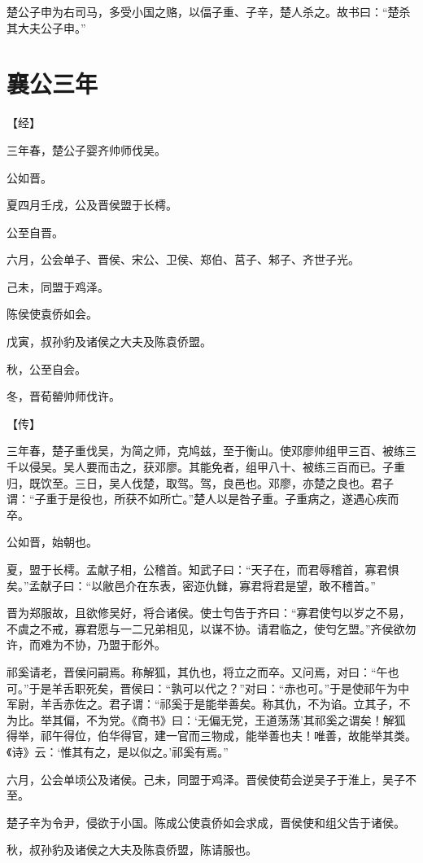 \documentclass[a4paper,12pt,UTF8,twoside]{ctexbook}
\begin{document}
楚公子申为右司马，多受小国之赂，以偪子重、子辛，楚人杀之。故书曰：“楚杀其大夫公子申。”

\section{襄公三年}



【经】

三年春，楚公子婴齐帅师伐吴。

公如晋。

夏四月壬戌，公及晋侯盟于长樗。

公至自晋。

六月，公会单子、晋侯、宋公、卫侯、郑伯、莒子、邾子、齐世子光。

己未，同盟于鸡泽。

陈侯使袁侨如会。

戊寅，叔孙豹及诸侯之大夫及陈袁侨盟。

秋，公至自会。

冬，晋荀罃帅师伐许。

【传】

三年春，楚子重伐吴，为简之师，克鸠兹，至于衡山。使邓廖帅组甲三百、被练三千以侵吴。吴人要而击之，获邓廖。其能免者，组甲八十、被练三百而已。子重归，既饮至。三日，吴人伐楚，取驾。驾，良邑也。邓廖，亦楚之良也。君子谓：“子重于是役也，所获不如所亡。”楚人以是咎子重。子重病之，遂遇心疾而卒。

公如晋，始朝也。

夏，盟于长樗。孟献子相，公稽首。知武子曰：“天子在，而君辱稽首，寡君惧矣。”孟献子曰：“以敝邑介在东表，密迩仇雠，寡君将君是望，敢不稽首。”

晋为郑服故，且欲修吴好，将合诸侯。使士匄告于齐曰：“寡君使匄以岁之不易，不虞之不戒，寡君愿与一二兄弟相见，以谋不协。请君临之，使匄乞盟。”齐侯欲勿许，而难为不协，乃盟于耏外。

祁奚请老，晋侯问嗣焉。称解狐，其仇也，将立之而卒。又问焉，对曰：“午也可。”于是羊舌职死矣，晋侯曰：“孰可以代之？”对曰：“赤也可。”于是使祁午为中军尉，羊舌赤佐之。君子谓：“祁奚于是能举善矣。称其仇，不为谄。立其子，不为比。举其偏，不为党。《商书》曰：‘无偏无党，王道荡荡’其祁奚之谓矣！解狐得举，祁午得位，伯华得官，建一官而三物成，能举善也夫！唯善，故能举其类。《诗》云：‘惟其有之，是以似之。’祁奚有焉。”

六月，公会单顷公及诸侯。己未，同盟于鸡泽。晋侯使荀会逆吴子于淮上，吴子不至。

楚子辛为令尹，侵欲于小国。陈成公使袁侨如会求成，晋侯使和组父告于诸侯。

秋，叔孙豹及诸侯之大夫及陈袁侨盟，陈请服也。
\end{document}
